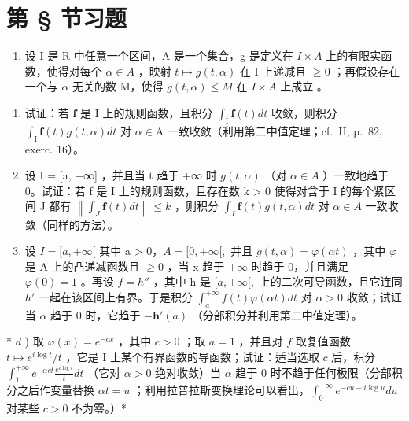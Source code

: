 \section*{第 \S{} 节习题}
{}

\begin{enumerate}
\def\labelenumi{\arabic{enumi})}
\tightlist
\item
  设 I 是 R 中任意一个区间，A 是一个集合，g 是定义在 \(I \times A\) 上的有限实函数，使得对每个 \(\alpha \in A\) ，映射 \(t \mapsto g(t, \alpha)\) 在 I 上递减且 \(\geqslant 0\) ；再假设存在一个与 \(\alpha\) 无关的数 M，使得 \(g(t, \alpha) \leqslant M\) 在 \(I \times A\) 上成立 。
\end{enumerate}

\begin{enumerate}
\def\labelenumi{\alph{enumi})}
\item
  试证：若 \(\mathbf{f}\) 是 I 上的规则函数，且积分 \(\int_{\mathrm{I}} \mathbf{f}(t) dt\) 收敛，则积分 \(\int_{\mathrm{I}} \mathbf{f}(t) g(t, \alpha) dt\) 对 \(\alpha \in \mathrm{A}\) 一致收敛（利用第二中值定理；cf.~II, p.~82, exerc. 16）。
\item
  设 I = {[}a, +∞{]} ，并且当 t 趋于 +∞ 时 \(g(t, \alpha)\) （对 \(\alpha \in A\) ）一致地趋于 0。试证：若 f 是 I 上的规则函数，且存在数 k \textgreater{} 0 使得对含于 I 的每个紧区间 J 都有 \(\left\|\int_{J} \mathbf{f}(t) dt\right\| \leqslant k\) ，则积分 \(\int_{I} \mathbf{f}(t) g(t, \alpha) dt\) 对 \(\alpha \in A\) 一致收敛（同样的方法）。
\item
  设 \(I = [a, +\infty[\) 其中 a \textgreater{} 0，\(A = [0, +\infty[,\) 并且 \(g(t, \alpha) = \varphi(\alpha t)\) ，其中 \(\varphi\) 是 A 上的凸递减函数且 \(\geqslant 0\) ，当 x 趋于 \(+\infty\) 时趋于 0，并且满足 \(\varphi(0) = 1\) 。再设 \(f = h''\) ，其中 h 是 \([a, +\infty[,\) 上的二次可导函数，且它连同 \(h'\) 一起在该区间上有界。于是积分 \(\int_{a}^{+\infty} f(t) \varphi(\alpha t) dt\) 对 \(\alpha > 0\) 收敛；试证当 \(\alpha\) 趋于 0 时，它趋于 \(-\mathbf{h}'(a)\) （分部积分并利用第二中值定理）。
\end{enumerate}

* \(d\) ) 取 \(\varphi (x) = e^{-cx}\) ，其中 \(c > 0\) ；取 \(a = 1\) ，并且对 \(f\) 取复值函数 \(t\mapsto e^{i\log t} / t\) ，它是 I 上某个有界函数的导函数；试证：适当选取 \(c\) 后，积分 \(\int_{1}^{+\infty}e^{-\alpha ct}\frac{e^{i\log t}}{t} dt\) （它对 \(\alpha >0\) 绝对收敛）当 \(\alpha\) 趋于 0 时不趋于任何极限（分部积分之后作变量替换 \(\alpha t = u\) ；利用拉普拉斯变换理论可以看出，\(\int_0^{+\infty}e^{-cu + i\log u}du\) 对某些 \(c > 0\) 不为零。）*

